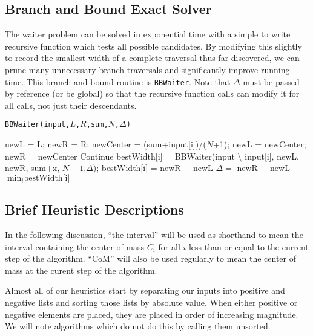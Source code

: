 \subsection{Branch and Bound Exact Solver}

The waiter problem can be solved in exponential time with a simple to write recursive function which tests all possible candidates.  By modifying this slightly to record the smallest width of a complete traversal thus far discovered, we can prune many unnecessary branch traversals and significantly improve running time.  This branch and bound routine is \texttt{BBWaiter}.  Note that $\Delta$ must be passed by reference (or be global) so that the recursive function calls can modify it for all calls, not just their descendants.

\begin{algorithm}
\caption{ \texttt{BBWaiter(input,$L$,$R$,sum,$N$,$\Delta$)} }
\label{alg:bbExhaustive}
\begin{algorithmic}
  \State newL = L;
  \State newR = R;
  \State newCenter = (sum+input[i])/($N$+1);
  \State newL = newCenter;
  \EndIf
  \State newR = newCenter
  \EndIf
  \State Continue
  \EndIf
  \State bestWidth[i] = BBWaiter(input $\setminus$ input[i], newL, newR, sum+x, $N+1$,$\Delta$);
  \Else
  \State bestWidth[i] = newR $-$ newL
  \EndIf
  \State $\Delta = $ newR $-$ newL
  \EndIf
\EndFor
\State \Return $\min_i {\textrm{bestWidth[i]}}$  
\end{algorithmic}
\end{algorithm}

\FloatBarrier
\subsection{Brief Heuristic Descriptions}

In the following discussion, ``the interval'' will be used as shorthand to mean the interval containing the center of mass $C_i$ for all $i$ less than or equal to the current step of the algorithm. ``CoM'' will also be used regularly to mean the center of mass at the curent step of the algorithm.

Almost all of our heuristics start by separating our inputs into positive and negative lists and sorting those lists by absolute value.  When either positive or negative elements are placed, they are placed in order of increasing magnitude. We will note algorithms which do not do this by calling them unsorted.

